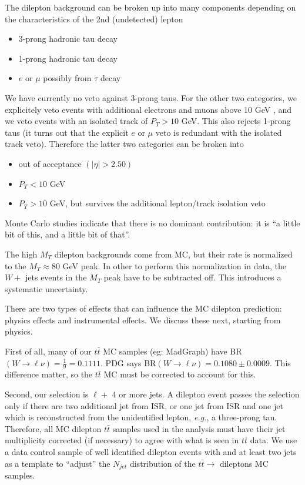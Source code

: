 The dilepton background can be broken up into many components depending
on the characteristics of the 2nd (undetected) lepton
\begin{itemize}
\item 3-prong hadronic tau decay
\item 1-prong hadronic tau decay 
\item $e$ or $\mu$ possibly from $\tau$ decay
\end{itemize}
We have currently no veto against 3-prong taus.  For the other two categories, we explicitely 
veto events with additional electrons and muons above 10 GeV , and
we veto events with an isolated track of $P_T > 10$ GeV.  This also rejects 1-prong taus
(it turns out that the explicit $e$ or $\mu$ veto is redundant with the isolated track veto).
Therefore the latter two categories can be broken into 
\begin{itemize}
\item out of acceptance $(|\eta| > 2.50)$
\item $P_T < 10$ GeV
\item $P_T > 10$ GeV, but survives the additional lepton/track isolation veto
\end{itemize}
Monte Carlo studies indicate that there is no dominant contribution: it is ``a little bit of this,
and a little bit of that''.

The high $M_T$ dilepton backgrounds come from MC, but their rate is normalized to the 
$M_T \approx 80$ GeV peak.  In other to perform this normalization in data, the $W +$ jets
events in the $M_T$ peak have to be subtracted off.  This introduces a systematic uncertainty.

There are two types of effects that can influence the MC dilepton prediction: physics effects 
and instrumental effects.  We discuss these next, starting from physics.

First of all, many of our $t\bar{t}$ MC samples (eg: MadGraph) have
 BR$(W \to \ell \nu)=\frac{1}{9} = 0.1111$.
PDG says BR$(W \to \ell \nu) = 0.1080 \pm 0.0009$.  This difference matter, so the $t\bar{t}$ MC 
must be corrected to account for this.

Second, our selection is $\ell +$ 4 or more jets.  A dilepton event passes the selection only if there are 
two additional jet from ISR, or one jet from ISR and one jet which is reconstructed from the 
unidentified lepton, {\it e.g.}, a three-prong tau.  Therefore, all MC dilepton $t\bar{t}$ samples used
in the analysis must have their jet multiplicity corrected (if necessary) to agree with what is 
seen in $t\bar{t}$ data.  We use a data control sample of well identified dilepton events with
\met and at least two jets as a template to ``adjust'' the $N_{jet}$ distribution of the $t\bar{t} \to$
dileptons MC samples.

